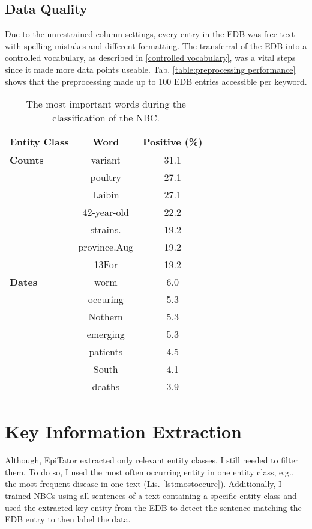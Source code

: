 \subsection{Data Quality}
Due to the unrestrained column settings, every entry in the EDB was free text with spelling mistakes and different formatting. The transferral of the EDB into a controlled vocabulary, as described in \ref{controlled vocabulary}, was a vital steps since it made more data points useable. Tab. \ref{table:preprocessing performance} shows that the preprocessing made up to 100 EDB entries accessible per keyword.

\begin{table}
  \centering
  \caption{The most important words during the classification of the NBC.}
  \begin{tabular}{@{}lcc@{}}
    \toprule
    \textbf{Entity Class}& \textbf{Word} & \textbf{Positive (\%)}\\

    \midrule
    \textbf{Counts}& variant& 31.1\\
    & poultry& 27.1\\
    & Laibin& 27.1\\
    & 42-year-old& 22.2\\
    & strains.& 19.2\\
    & province.Aug& 19.2\\
    & 13For& 19.2\vspace{2mm}\\
    \textbf{Dates}
    & worm& 6.0\\
    & occuring& 5.3\\
    & Nothern& 5.3\\
    & emerging& 5.3\\
    & patients& 4.5\\
    & South& 4.1\\
    & deaths& 3.9\\

    \bottomrule
  \end{tabular}
  \label{table:important_words}
\end{table}

\section{Key Information Extraction}
Although, EpiTator extracted only relevant entity classes, I still needed to filter them.
To do so, I used the most often occurring entity in one entity class, e.g., the most frequent disease in one text (Lis. \ref{lst:mostoccure}).
Additionally, I trained NBCs using all sentences of a text containing a specific entity class and used the extracted key entity from the EDB to detect the sentence matching the EDB entry to then label the data.

